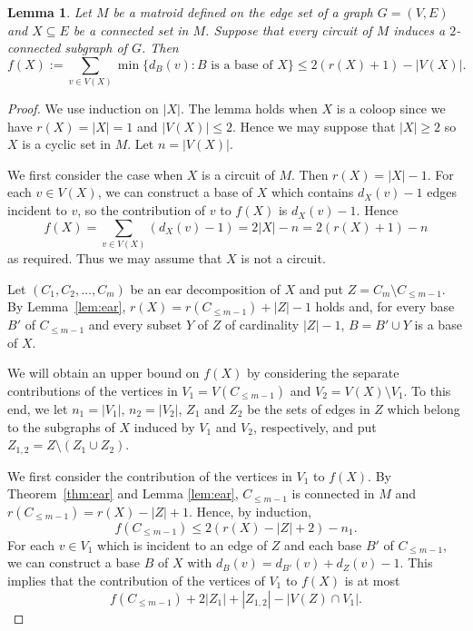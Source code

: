 \documentclass{daj}
\newtheorem{lemma}[thm]{Lemma}\theoremstyle{plain}
\newcommand{\sm}{{\setminus}}
\begin{document}
\begin{lemma}\label{lem:degree}
Let $M$ be a matroid defined on the edge set of a graph $G=(V,E)$ and $X\subseteq E$ be a connected set  in  $M$. 
Suppose that every circuit of $M$ induces a $2$-connected subgraph of $G$.  Then
$$
f(X):=\sum_{v\in V(X)}\min\{d_B(v):\mbox{$B$ is a base of $X$}\}\leq 2(r(X)+1)-|V(X)|.$$
\end{lemma}
\begin{proof}
We use induction on $|X|$. The lemma holds when $X$ is a coloop since we have $r(X)=|X|=1$ and $|V(X)|\leq 2$. Hence we may suppose that $|X|\geq 2$ so $X$ is a cyclic set in $M$.  Let $n=|V(X)|$.

We first consider the case when $X$ is a circuit of $M$. Then $r(X)=|X|-1$. For each $v\in V(X)$, we can construct a base of $X$ which contains $d_X(v)-1$ edges incident to $v$, so the contribution of $v$ to $f(X)$ is $d_X(v)-1$. Hence
$$f(X)=\sum_{v\in V(X)}(d_X(v)-1)=2|X|-n=2(r(X)+1)-n
$$
as required. Thus we may assume that $X$ is not a circuit.


Let $(C_1,C_2,\ldots,C_m)$ be an ear decomposition of $X$ and put $Z=C_m\sm C_{\leq m-1}$. By Lemma~\ref{lem:ear}, $r(X)=r(C_{\leq m-1})+|Z|-1$ holds and, for  every base $B'$ of $C_{\leq m-1}$ and every  subset $Y$ of $Z$ of cardinality $|Z|-1$, $B=B'\cup Y$ is a base of $X$.

We will obtain an upper bound on $f(X)$ by considering the separate contributions of the vertices in  $V_1=V( C_{\leq m-1})$ and $V_2=V(X)\sm V_1$. To this end, we let $n_1=|V_1|$, $n_2=|V_2|$, $Z_1$ and $Z_2$ be the sets of edges in $Z$ which belong to the subgraphs of $X$ induced by $V_1$ and $V_2$, respectively, and put $Z_{1,2}=Z\sm (Z_1\cup Z_2)$.

We first consider the contribution of the vertices in $V_1$ to $f(X)$. 
By Theorem~\ref{thm:ear} and Lemma \ref{lem:ear}, $C_{\leq m-1}$ is connected in $M$ and $r(C_{\leq m-1})= r(X)-|Z|+1$. Hence, by induction,
\begin{equation}\label{eq:degree1}
f(C_{\leq m-1})\leq 2(r(X)-|Z|+2)-n_1.
\end{equation}
For each $v\in V_1$ which is incident to an edge of $Z$ and each base $B'$ of $C_{\leq m-1}$,  we can construct a base $B$ of $X$ with $d_B(v)=d_{B'}(v)+d_{Z}(v)-1$. This implies that  the contribution of the vertices of $V_1$ to $f(X)$ is at most
\begin{equation}\label{eq:degree2}
f(C_{\leq m-1})+2|Z_1|+|Z_{1,2}|-|V(Z)\cap V_1|.
\end{equation}





\end{proof}
\end{document}
